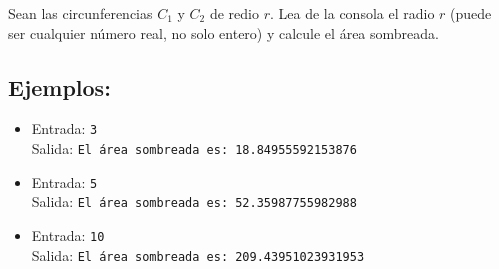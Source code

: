 Sean las circunferencias $C_1$ y $C_2$ de redio $r$. Lea de la consola el radio $r$ (puede ser cualquier número real, no solo entero) y calcule el área sombreada.

\begin{center}
\end{center}

\subsection*{Ejemplos:}
\begin{itemize}
    \item Entrada: \texttt{3}\\
          Salida: \texttt{El área sombreada es: 18.84955592153876}
    \item Entrada: \texttt{5}\\
          Salida: \texttt{El área sombreada es: 52.35987755982988}
    \item Entrada: \texttt{10}\\
          Salida: \texttt{El área sombreada es: 209.43951023931953}
\end{itemize}
